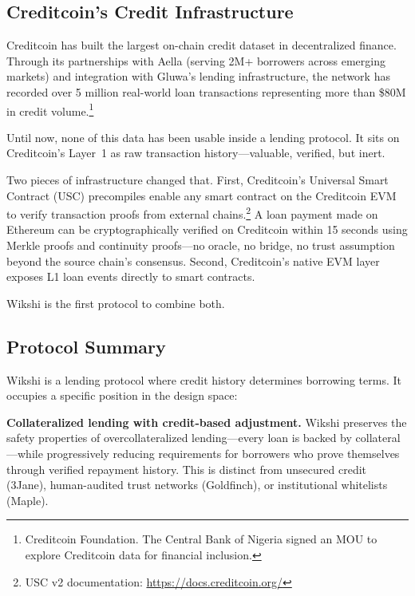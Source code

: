 \documentclass[11pt,a4paper]{article}
\begin{document}
\subsection{Creditcoin's Credit Infrastructure}

Creditcoin has built the largest on-chain credit dataset in decentralized finance. Through its partnerships with Aella (serving 2M+ borrowers across emerging markets) and integration with Gluwa's lending infrastructure, the network has recorded over 5 million real-world loan transactions representing more than \$80M in credit volume.\footnote{Creditcoin Foundation. The Central Bank of Nigeria signed an MOU to explore Creditcoin data for financial inclusion.}

Until now, none of this data has been usable inside a lending protocol. It sits on Creditcoin's Layer~1 as raw transaction history---valuable, verified, but inert.

Two pieces of infrastructure changed that. First, Creditcoin's Universal Smart Contract (USC) precompiles enable any smart contract on the Creditcoin EVM to verify transaction proofs from external chains.\footnote{USC v2 documentation: \url{https://docs.creditcoin.org/}} A loan payment made on Ethereum can be cryptographically verified on Creditcoin within 15 seconds using Merkle proofs and continuity proofs---no oracle, no bridge, no trust assumption beyond the source chain's consensus. Second, Creditcoin's native EVM layer exposes L1 loan events directly to smart contracts.

Wikshi is the first protocol to combine both.

\subsection{Protocol Summary}

Wikshi is a lending protocol where credit history determines borrowing terms. It occupies a specific position in the design space:

\begin{keyinsight}
\textbf{Collateralized lending with credit-based adjustment.} Wikshi preserves the safety properties of overcollateralized lending---every loan is backed by collateral---while progressively reducing requirements for borrowers who prove themselves through verified repayment history. This is distinct from unsecured credit (3Jane), human-audited trust networks (Goldfinch), or institutional whitelists (Maple).
\end{keyinsight}
\end{document}
